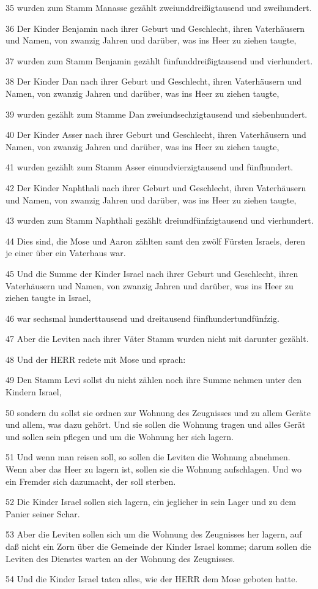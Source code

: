 \par 35 wurden zum Stamm Manasse gezählt zweiunddreißigtausend und zweihundert.
\par 36 Der Kinder Benjamin nach ihrer Geburt und Geschlecht, ihren Vaterhäusern und Namen, von zwanzig Jahren und darüber, was ins Heer zu ziehen taugte,
\par 37 wurden zum Stamm Benjamin gezählt fünfunddreißigtausend und vierhundert.
\par 38 Der Kinder Dan nach ihrer Geburt und Geschlecht, ihren Vaterhäusern und Namen, von zwanzig Jahren und darüber, was ins Heer zu ziehen taugte,
\par 39 wurden gezählt zum Stamme Dan zweiundsechzigtausend und siebenhundert.
\par 40 Der Kinder Asser nach ihrer Geburt und Geschlecht, ihren Vaterhäusern und Namen, von zwanzig Jahren und darüber, was ins Heer zu ziehen taugte,
\par 41 wurden gezählt zum Stamm Asser einundvierzigtausend und fünfhundert.
\par 42 Der Kinder Naphthali nach ihrer Geburt und Geschlecht, ihren Vaterhäusern und Namen, von zwanzig Jahren und darüber, was ins Heer zu ziehen taugte,
\par 43 wurden zum Stamm Naphthali gezählt dreiundfünfzigtausend und vierhundert.
\par 44 Dies sind, die Mose und Aaron zählten samt den zwölf Fürsten Israels, deren je einer über ein Vaterhaus war.
\par 45 Und die Summe der Kinder Israel nach ihrer Geburt und Geschlecht, ihren Vaterhäusern und Namen, von zwanzig Jahren und darüber, was ins Heer zu ziehen taugte in Israel,
\par 46 war sechsmal hunderttausend und dreitausend fünfhundertundfünfzig.
\par 47 Aber die Leviten nach ihrer Väter Stamm wurden nicht mit darunter gezählt.
\par 48 Und der HERR redete mit Mose und sprach:
\par 49 Den Stamm Levi sollst du nicht zählen noch ihre Summe nehmen unter den Kindern Israel,
\par 50 sondern du sollst sie ordnen zur Wohnung des Zeugnisses und zu allem Geräte und allem, was dazu gehört. Und sie sollen die Wohnung tragen und alles Gerät und sollen sein pflegen und um die Wohnung her sich lagern.
\par 51 Und wenn man reisen soll, so sollen die Leviten die Wohnung abnehmen. Wenn aber das Heer zu lagern ist, sollen sie die Wohnung aufschlagen. Und wo ein Fremder sich dazumacht, der soll sterben.
\par 52 Die Kinder Israel sollen sich lagern, ein jeglicher in sein Lager und zu dem Panier seiner Schar.
\par 53 Aber die Leviten sollen sich um die Wohnung des Zeugnisses her lagern, auf daß nicht ein Zorn über die Gemeinde der Kinder Israel komme; darum sollen die Leviten des Dienstes warten an der Wohnung des Zeugnisses.
\par 54 Und die Kinder Israel taten alles, wie der HERR dem Mose geboten hatte.

